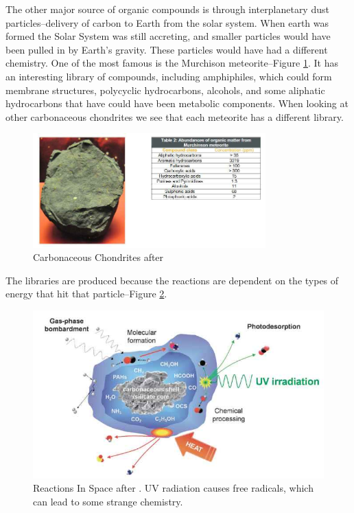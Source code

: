 \documentclass[]{article}
\begin{document}
The other major source of organic compounds is through interplanetary dust particles--delivery of carbon to Earth from the solar system. When earth was formed the Solar System was still accreting, and smaller particles would have been pulled in by Earth's gravity.  These particles would have had a different chemistry. One of the most famous is the Murchison meteorite--Figure \ref{fig:CarbonaceousChondrites}. It has an interesting library of compounds, including amphiphiles, which could form membrane structures, polycyclic hydrocarbons, alcohols, and some aliphatic hydrocarbons that have could have been metabolic components. When looking at other carbonaceous chondrites  we see that each meteorite has a different library.
\begin{figure}[H]
	\caption[Carbonaceous Chondrites]{Carbonaceous Chondrites after \cite{ehrenfreund2002astrophysical}}\label{fig:CarbonaceousChondrites}
	\includegraphics[width=0.8\textwidth]{CarbonaceousChondrites}
\end{figure}


The libraries are produced because the reactions are dependent on the types of energy that hit that particle--Figure \ref{fig:ReactionsInSpace}.

\begin{figure}[H]
	\caption[Reactions In Space]{Reactions In Space after \cite{dalai2016incubating}. UV radiation causes free radicals, which can lead to some strange chemistry.}\label{fig:ReactionsInSpace}
	\includegraphics[width=\textwidth]{ReactionsInSpace}
\end{figure}
\end{document}
